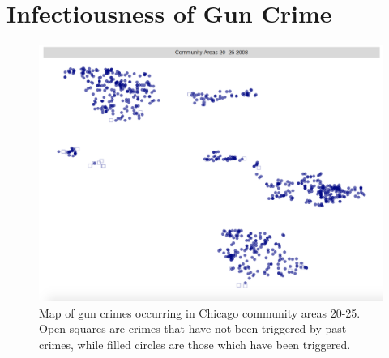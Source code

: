 \documentclass{article}
\begin{document}
\pagebreak
\section*{Infectiousness of Gun Crime}
 \begin{figure} [htbp] \centering
  \includegraphics[scale=0.50]{figures/ChicagoCA2025_2008}
  \caption{Map of gun crimes occurring in Chicago community areas 20-25. Open squares are crimes that have not been triggered by past crimes, while filled circles are those which have been triggered.}
  \end{figure}
\end{document}
